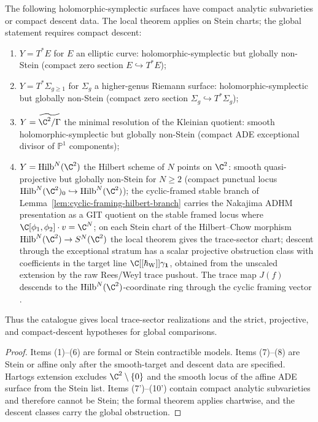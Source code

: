 \begin{cor}
The following holomorphic-symplectic surfaces have compact analytic
subvarieties or compact descent data.  The local theorem applies on
Stein charts; the global statement requires compact descent:
\begin{enumerate}[label=\textup{(\arabic*$'$)},start=7]
  \item \(Y=T^*E\) for \(E\) an elliptic curve: holomorphic-symplectic
        but globally non-Stein (compact zero section
        \(E\hookrightarrow T^*E\));
  \item \(Y=T^*\Sigma_{g\geq 1}\) for \(\Sigma_g\) a higher-genus
        Riemann surface: holomorphic-symplectic but globally non-Stein
        (compact zero section \(\Sigma_g\hookrightarrow T^*\Sigma_g\));
  \item \(Y=\widetilde{\C^2/\Gamma}\) the minimal resolution of the
        Kleinian quotient: smooth holomorphic-symplectic but globally
        non-Stein (compact ADE exceptional divisor of \(\mathbb P^1\)
        components);
  \item \(Y=\mathrm{Hilb}^N(\C^2)\) the Hilbert scheme of \(N\) points
        on \(\C^2\): smooth quasi-projective but globally non-Stein
        for \(N\geq 2\) (compact punctual locus
        \(\mathrm{Hilb}^N(\C^2)_0\hookrightarrow\mathrm{Hilb}^N(\C^2)\));
        the cyclic-framed stable branch of
        Lemma~\ref{lem:cyclic-framing-hilbert-branch} carries the
        Nakajima ADHM presentation
        \cite{nakajima-hilbert-lectures} as a GIT quotient on the
        stable framed locus where \(\C[\phi_1,\phi_2]\cdot v=\C^N\);
        on each Stein chart of the Hilbert--Chow morphism
        \(\mathrm{Hilb}^N(\C^2)\to S^N(\C^2)\) the local theorem
	        gives the trace-sector chart; descent through the
	        exceptional stratum has a scalar projective obstruction class
	        with coefficients in the target line
	        \(\C[[\hbar_{\mathrm W}]]\gamma_{\mathbf1}\), obtained from the
	        unscaled extension by the raw Rees/Weyl trace pushout.  The trace map
        \(J(f)\) descends to the
        \(\mathrm{Hilb}^N(\C^2)\)-coordinate ring through the cyclic
        framing vector \cite{nakajima-hilbert-lectures}.
\end{enumerate}
Thus the catalogue gives local trace-sector realizations and the
strict, projective, and compact-descent hypotheses for global
comparisons.
\end{cor}

\begin{proof}
Items (1)--(6) are formal or Stein contractible models.  Items
(7)--(8) are Stein or affine only after the smooth-target and descent
data are specified.  Hartogs extension excludes
\(\C^2\setminus\{0\}\) and the smooth locus of the affine ADE
surface from the Stein list.  Items (7')--(10') contain
compact analytic subvarieties and therefore cannot be Stein; the
formal theorem applies chartwise, and the descent classes carry the
global obstruction.
\end{proof}

